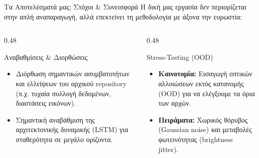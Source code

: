 \documentclass[10pt, aspectratio=169]{beamer}
\begin{document}
\begin{frame}{Τα Αποτελέσματά μας: Στόχοι \& Συνεισφορά}
    \footnotesize Η δική μας εργασία δεν περιορίζεται στην απλή αναπαραγωγή, αλλά επεκτείνει τη μεθοδολογία με άξονα την ευρωστία:\par\vspace{0.15cm}
    \begin{columns}[onlytextwidth, T]
        \begin{column}{0.48\textwidth}
            \begin{block}{Αναβαθμίσεις \& Διορθώσεις}
                \begin{itemize}
                    \item \scriptsize Διόρθωση σημαντικών ασυμβατοτήτων και ελλείψεων του αρχικού \textlatin{repository} (π.χ. τυχαία συλλογή δεδομένων, διαστάσεις εικόνων).
                    \item \scriptsize Σημαντική αναβάθμιση της αρχιτεκτονικής δυναμικής (\textlatin{LSTM}) για σταθερότητα σε μεγάλο ορίζοντα.
                \end{itemize}
            \end{block}
        \end{column}
        \begin{column}{0.48\textwidth}
            \begin{block}{Stress-Testing (OOD)}
                \begin{itemize}
                    \item \scriptsize \textbf{Καινοτομία:} Εισαγωγή οπτικών αλλοιώσεων εκτός κατανομής (\textlatin{OOD}) για να ελέγξουμε τα όρια των αρχών.
                    \item \scriptsize \textbf{Πειράματα:} Χωρικός θόρυβος (\textlatin{Gaussian noise}) και μεταβολές φωτεινότητας (\textlatin{brightness jitter}).
                \end{itemize}
            \end{block}
        \end{column}
    \end{columns}
\end{frame}
\end{document}
